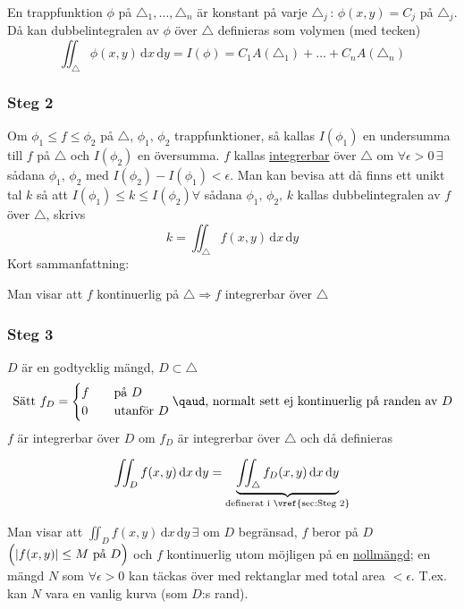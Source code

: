 \documentclass{article}
\DeclarePairedDelimiter \abs{\lvert}{\rvert}
\begin{document}
En trappfunktion $\phi$ på $\triangle_1,\ldots,\triangle_n$ är konstant på varje $\triangle_j \,:\, \phi(x,y) = C_j$ på $\triangle_j$. Då kan dubbelintegralen av $\phi$ över $\triangle$ definieras som volymen (med tecken)
$$
	\iint_\triangle \phi(x,y) \,\mathrm{d}x\,\mathrm{d}y = I(\phi) = C_1A(\triangle_1) + \ldots + C_nA(\triangle_n)
$$

\newpage
\subsubsection{Steg 2} \label{sec:Steg 2}
Om $\phi_1 \leq f \leq \phi_2$ på $\triangle$, $\phi_1, \, \phi_2$ trappfunktioner, så kallas $I(\phi_1)$ en undersumma till $f$ på $\triangle$ och $I(\phi_2)$ en översumma. 
$f$ kallas \underline{integrerbar} över $\triangle$ om $\forall \epsilon > 0 \, \exists$ sådana $\phi_1, \, \phi_2$ med $I(\phi_2) - I(\phi_1) < \epsilon$.
Man kan bevisa att då finns ett unikt tal $k$ så att $I(\phi_1) \leq k \leq I(\phi_2) \forall$ sådana $\phi_1, \, \phi_2, \, k$ kallas dubbelintegralen av $f$ över $\triangle$, skrivs
$$
	k = \iint_\triangle f(x,y) \,\mathrm{d}x\,\mathrm{d}y
$$
Kort sammanfattning:
\begin{framed}
	Man visar att $f$ kontinuerlig på $\triangle \Rightarrow f$ integrerbar över $\triangle$
\end{framed}

\subsubsection{Steg 3}
$D$ är en godtycklig mängd, $D \subset \triangle$ \newline
$$
	\text{Sätt } f_D = 
	\begin{cases}
		f & \quad \text{på } D \\
		0 & \quad \text{utanför } D \\
  	\end{cases}
  	\qaud \text{, normalt sett ej kontinuerlig på randen av } D
$$
$f$ är integrerbar över $D$ om $f_D$ är integrerbar över $\triangle$ och då definieras

$$
	\iint_D f(x,y) \,\mathrm{d}x\,\mathrm{d}y = \underbrace{\iint_\triangle f_D(x,y) \,\mathrm{d}x\,\mathrm{d}y}_{\text{definerat i \vref{sec:Steg 2}}}
$$

Man visar att $\iint_D f(x,y) \,\mathrm{d}x\,\mathrm{d}y \, \exists$ om $D$ begränsad, $f$ beror på $D$ $\Big( \abs{f(x,y)} \leq M \text{ på } D \Big)$ och $f$ kontinuerlig utom möjligen på en \underline{nollmängd};
en mängd $N$ som $\forall \epsilon > 0$ kan täckas över med rektanglar med total area $< \epsilon$. T.ex. kan $N$ vara en vanlig kurva (som $D$:s rand). \newline
\end{document}
